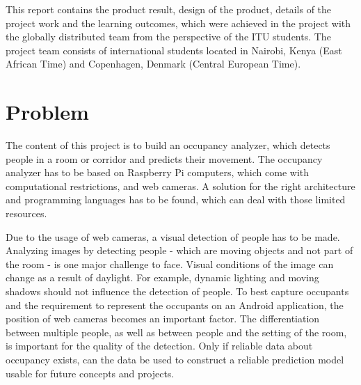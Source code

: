 This report contains the product result, design of the product, details of the project work and the learning outcomes, which were achieved in the project with the globally distributed team from the perspective of the ITU students. The project team consists of international students located in Nairobi, Kenya (East African Time) and Copenhagen, Denmark (Central European Time).


\section{Problem}


The content of this project is to build an occupancy analyzer, which detects people in a room or corridor and predicts their movement. The occupancy analyzer has to be based on Raspberry Pi computers, which come with computational restrictions, and web cameras. A solution for the right architecture and programming languages has to be found, which can deal with those limited resources.

Due to the usage of web cameras, a visual detection of people has to be made. Analyzing images by detecting people - which are moving objects and not part of the room - is one major challenge to face. Visual conditions of the image can change as a result of daylight. For example, dynamic lighting and moving shadows should not influence the detection of people. 
To best capture occupants and the requirement to represent the occupants on an Android application, the position of web cameras becomes an important factor.
The differentiation between multiple people, as well as between people and the setting of the room, is important for the quality of the detection. Only if reliable data about occupancy exists, can the data be used to construct a reliable prediction model usable for future concepts and projects.

